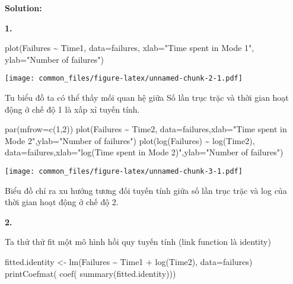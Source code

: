\documentclass[
]{article}
\newenvironment{Shaded}{\begin{snugshade}}{\end{snugshade}}
\newcommand{\AttributeTok}[1]{\textcolor[rgb]{0.77,0.63,0.00}{#1}}
\newcommand{\DecValTok}[1]{\textcolor[rgb]{0.00,0.00,0.81}{#1}}
\newcommand{\FunctionTok}[1]{\textcolor[rgb]{0.00,0.00,0.00}{#1}}
\newcommand{\NormalTok}[1]{#1}
\newcommand{\OtherTok}[1]{\textcolor[rgb]{0.56,0.35,0.01}{#1}}
\newcommand{\SpecialCharTok}[1]{\textcolor[rgb]{0.00,0.00,0.00}{#1}}
\newcommand{\StringTok}[1]{\textcolor[rgb]{0.31,0.60,0.02}{#1}}
\begin{document}
\textbf{Solution:}

\textbf{1.}

\begin{Shaded}
\begin{Highlighting}[]
\FunctionTok{plot}\NormalTok{(Failures }\SpecialCharTok{\textasciitilde{}}\NormalTok{ Time1, }\AttributeTok{data=}\NormalTok{failures, }\AttributeTok{xlab=}\StringTok{"Time spent in Mode 1"}\NormalTok{, }\AttributeTok{ylab=}\StringTok{"Number of failures"}\NormalTok{)}
\end{Highlighting}
\end{Shaded}

\texttt{[image: common\_files/figure-latex/unnamed-chunk-2-1.pdf]}

Tu biểu đồ ta có thể thấy mối quan hệ giữa Số lần trục trặc và thời gian
hoạt động ở chế độ 1 là xấp xỉ tuyến tính.

\begin{Shaded}
\begin{Highlighting}[]
\FunctionTok{par}\NormalTok{(}\AttributeTok{mfrow=}\FunctionTok{c}\NormalTok{(}\DecValTok{1}\NormalTok{,}\DecValTok{2}\NormalTok{))}
\FunctionTok{plot}\NormalTok{(Failures }\SpecialCharTok{\textasciitilde{}}\NormalTok{ Time2, }\AttributeTok{data=}\NormalTok{failures,}\AttributeTok{xlab=}\StringTok{"Time spent in Mode 2"}\NormalTok{,}\AttributeTok{ylab=}\StringTok{"Number of failures"}\NormalTok{)}
\FunctionTok{plot}\NormalTok{(}\FunctionTok{log}\NormalTok{(Failures) }\SpecialCharTok{\textasciitilde{}} \FunctionTok{log}\NormalTok{(Time2), }\AttributeTok{data=}\NormalTok{failures,}\AttributeTok{xlab=}\StringTok{"log(Time spent in Mode 2)"}\NormalTok{,}\AttributeTok{ylab=}\StringTok{"Number of failures"}\NormalTok{)}
\end{Highlighting}
\end{Shaded}

\texttt{[image: common\_files/figure-latex/unnamed-chunk-3-1.pdf]}

Biểu đồ chỉ ra xu hướng tương đối tuyến tính giữa số lần trục trặc và
log của thời gian hoạt động ở chế độ 2.

\textbf{2.}

Ta thử thử fit một mô hình hồi quy tuyến tính (link function là
identity)

\begin{Shaded}
\begin{Highlighting}[]
\NormalTok{fitted.identity }\OtherTok{\textless{}{-}} \FunctionTok{lm}\NormalTok{(Failures }\SpecialCharTok{\textasciitilde{}}\NormalTok{ Time1 }\SpecialCharTok{+} \FunctionTok{log}\NormalTok{(Time2), }\AttributeTok{data=}\NormalTok{failures)}
\FunctionTok{printCoefmat}\NormalTok{( }\FunctionTok{coef}\NormalTok{( }\FunctionTok{summary}\NormalTok{(fitted.identity)))}
\end{Highlighting}
\end{Shaded}
\end{document}
